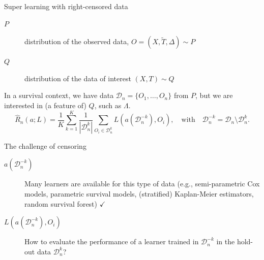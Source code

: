 \documentclass[smaller]{beamer}\usepackage{listings}
\begin{document}
\begin{frame}[label={sec:org54705f8}]{Super learning with right-censored data}
\small

\begin{description}
\item[{\(P\)}] distribution of the observed data, \(O = (X, \tilde T, \Delta)
  \sim P\)
\item[{\(Q\)}] distribution of the data of interest \((X, T) \sim Q\)
\end{description}

\hfill

In a survival context, we have data \(\mathcal{D}_n = \{O_1, \dots, O_n\}\)
from \(P\), but we are interested in (a feature of) \(Q\), such as
\(\Lambda\).
\begin{equation*}
  \hat{R}_n(a; L) =
  \frac{1}{K}\sum_{k=1}^{K}
  \frac{1}{| \mathcal{D}_n^{k} |}\sum_{O_i \in \mathcal{D}_n^{k}}
  L
  {
    \left(
      a{ (\mathcal{D}_n^{-k})}
      , O_i
    \right)
  },
  \quad \text{with} \quad
  \mathcal{D}_n^{-k} = \mathcal{D}_n \setminus \mathcal{D}_n^{k}.
\end{equation*}

\pause

\begin{block}{The challenge of censoring}
\begin{description}
\item[{\(a{ (\mathcal{D}_n^{-k})}\)}] Many learners are available for this type of
data (e.g., semi-parametric Cox models, parametric survival models,
(stratified) Kaplan-Meier estimators, random survival forest) \(\checkmark\)
\item[{\(L(a{ (\mathcal{D}_n^{-k})} , O_i)\)}] How to evaluate the performance of
a learner trained in \(\mathcal{D}_n^{-k}\) in the hold-out data \(\mathcal{D}_n^{k}\)?
\end{description}
\end{block}
\end{frame}
\end{document}
